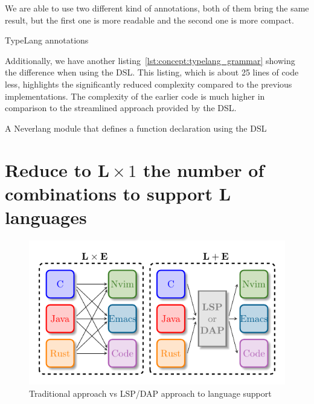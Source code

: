 We are able to use two different kind of annotations, both of them bring the same result, but the first one is more readable and the second one is more compact.

\begin{Listing}
    \centering
    \caption{TypeLang annotations}
    \label{lst:concept:typelang_annotations}
\end{Listing}

Additionally, we have another listing~\ref{lst:concept:typelang_grammar} showing the difference when using the DSL. This listing, which is about 25 lines of code less, highlights the significantly reduced complexity compared to the previous implementations. The complexity of the earlier code is much higher in comparison to the streamlined approach provided by the DSL.

\begin{Listing}
    \centering
    \caption{A Neverlang module that defines a function declaration using the DSL}
    \label{lst:concept:fun_declaration_typecheck}
\end{Listing}

\section{Reduce to $\mathbf{L} \times 1$ the number of combinations to support $\mathbf{L}$ languages}

\begin{figure}[t]
    \centering
    \includegraphics[width=0.9\linewidth]{figs/concept/lsp_combinations.pdf}
    \caption{Traditional approach vs LSP/DAP approach to language support}
    \label{lst:concept:lsp_combinations}
\end{figure}

